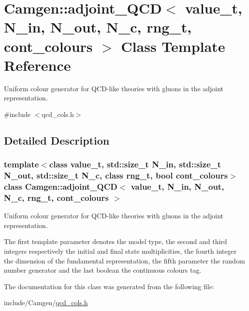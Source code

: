 \hypertarget{a00003}{\section{Camgen\-:\-:adjoint\-\_\-\-Q\-C\-D$<$ value\-\_\-t, N\-\_\-in, N\-\_\-out, N\-\_\-c, rng\-\_\-t, cont\-\_\-colours $>$ Class Template Reference}
\label{a00003}
}


Uniform colour generator for Q\-C\-D-\/like theories with gluons in the adjoint representation.  




{\ttfamily \#include $<$qcd\-\_\-cols.\-h$>$}



\subsection{Detailed Description}
\subsubsection*{template$<$class value\-\_\-t, std\-::size\-\_\-t N\-\_\-in, std\-::size\-\_\-t N\-\_\-out, std\-::size\-\_\-t N\-\_\-c, class rng\-\_\-t, bool cont\-\_\-colours$>$class Camgen\-::adjoint\-\_\-\-Q\-C\-D$<$ value\-\_\-t, N\-\_\-in, N\-\_\-out, N\-\_\-c, rng\-\_\-t, cont\-\_\-colours $>$}

Uniform colour generator for Q\-C\-D-\/like theories with gluons in the adjoint representation. 

The first template parameter denotes the model type, the second and third integers respectively the initial and final state multiplicities, the fourth integer the dimension of the fundamental representation, the fifth parameter the random number generator and the last boolean the continuous colours tag. 

The documentation for this class was generated from the following file\-:\begin{DoxyCompactItemize}
\item 
include/\-Camgen/\hyperlink{a00724}{qcd\-\_\-cols.\-h}\end{DoxyCompactItemize}
